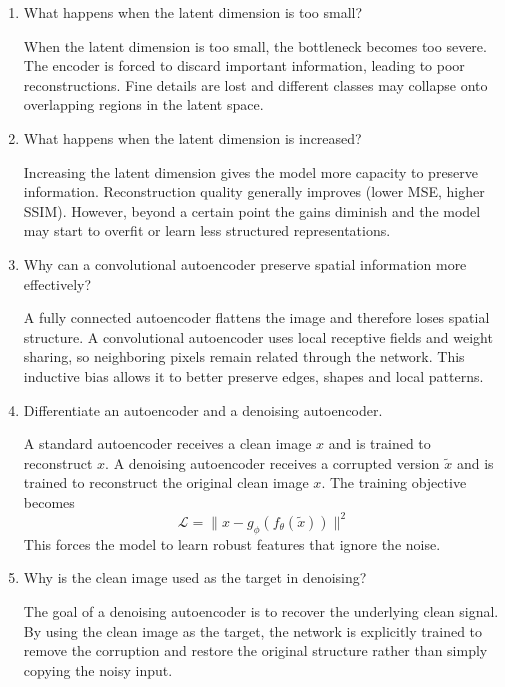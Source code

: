 \documentclass[10pt]{article}
\begin{document}
\begin{enumerate}
\item What happens when the latent dimension is too small?

When the latent dimension is too small, the bottleneck becomes too severe. The encoder is forced to discard important information, leading to poor reconstructions. Fine details are lost and different classes may collapse onto overlapping regions in the latent space.\\

\item What happens when the latent dimension is increased?

Increasing the latent dimension gives the model more capacity to preserve information. Reconstruction quality generally improves (lower MSE, higher SSIM). However, beyond a certain point the gains diminish and the model may start to overfit or learn less structured representations.\\

\item Why can a convolutional autoencoder preserve spatial information more effectively?

A fully connected autoencoder flattens the image and therefore loses spatial structure. A convolutional autoencoder uses local receptive fields and weight sharing, so neighboring pixels remain related through the network. This inductive bias allows it to better preserve edges, shapes and local patterns.\\

\item Differentiate an autoencoder and a denoising autoencoder.

A standard autoencoder receives a clean image \(x\) and is trained to reconstruct \(x\). A denoising autoencoder receives a corrupted version \(\tilde{x}\) and is trained to reconstruct the original clean image \(x\). The training objective becomes
\[
\mathcal{L} = \|x - g_\phi(f_\theta(\tilde{x}))\|^2
\]
This forces the model to learn robust features that ignore the noise.\\

\item Why is the clean image used as the target in denoising?

The goal of a denoising autoencoder is to recover the underlying clean signal. By using the clean image as the target, the network is explicitly trained to remove the corruption and restore the original structure rather than simply copying the noisy input.\\


\end{enumerate}
\end{document}
